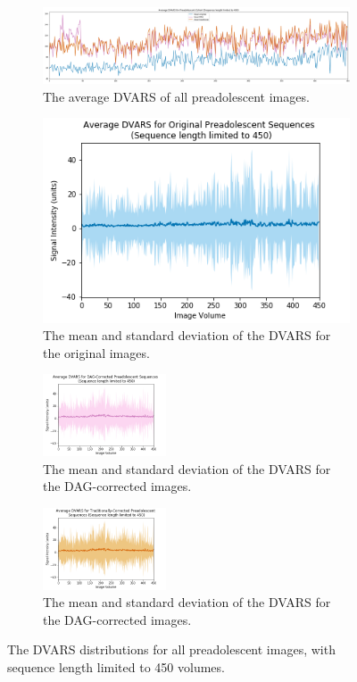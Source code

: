 \begin{figure}[ht]
	\centering
	\begin{subfigure}{0.9\textwidth}
		\centering
		\includegraphics[width=1.0\textwidth]{6/figures/pread_dvars_all_450_avg.png}
		\caption{The average DVARS of all preadolescent images.}
	\end{subfigure}

	\begin{subfigure}{0.9\textwidth}
		\centering
		\includegraphics[width=.4\textwidth]{6/figures/pread-bold-dvars-450.png}
		\caption{The mean and standard deviation of the DVARS for the original images.}
	\end{subfigure}
	
	\begin{subfigure}{0.9\textwidth}
		\centering
		\includegraphics[width=0.4\textwidth]{6/figures/pread-dag-dvars-450.png}
		\caption{The mean and standard deviation of the DVARS for the DAG-corrected images.}
	\end{subfigure}
	
	\begin{subfigure}{0.9\textwidth}
		\centering
		\includegraphics[width=0.4\textwidth]{6/figures/pread-trad-dvars-450.png}
		\caption{The mean and standard deviation of the DVARS for the DAG-corrected images.}
	\end{subfigure}
\caption{The DVARS distributions for all preadolescent images, with sequence length limited to 450 volumes.}
\label{fig:pread-dvars-450}
\end{figure}

